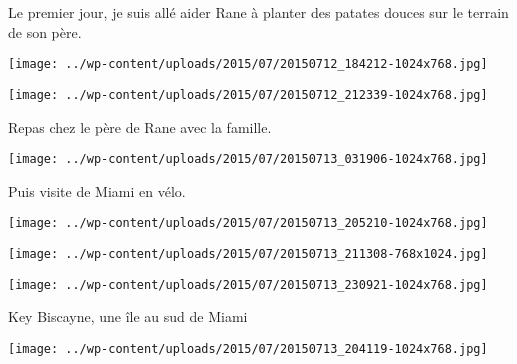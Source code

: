  

 Le premier jour, je suis allé aider Rane à planter des patates douces sur le terrain de son père. 

 

\begin{center} \texttt{[image: ../wp-content/uploads/2015/07/20150712\_184212-1024x768.jpg]} \end{center}

 

 

\begin{center} \texttt{[image: ../wp-content/uploads/2015/07/20150712\_212339-1024x768.jpg]} \end{center}

 

 Repas chez le père de Rane avec la famille. 

 

\begin{center} \texttt{[image: ../wp-content/uploads/2015/07/20150713\_031906-1024x768.jpg]} \end{center}

 

 Puis visite de Miami en vélo. 

 

\begin{center} \texttt{[image: ../wp-content/uploads/2015/07/20150713\_205210-1024x768.jpg]} \end{center}

 

 

\begin{center} \texttt{[image: ../wp-content/uploads/2015/07/20150713\_211308-768x1024.jpg]} \end{center}

 

 

\begin{center} \texttt{[image: ../wp-content/uploads/2015/07/20150713\_230921-1024x768.jpg]} \end{center}

 

 Key Biscayne, une île au sud de Miami 

 

\begin{center} \texttt{[image: ../wp-content/uploads/2015/07/20150713\_204119-1024x768.jpg]} \end{center}

